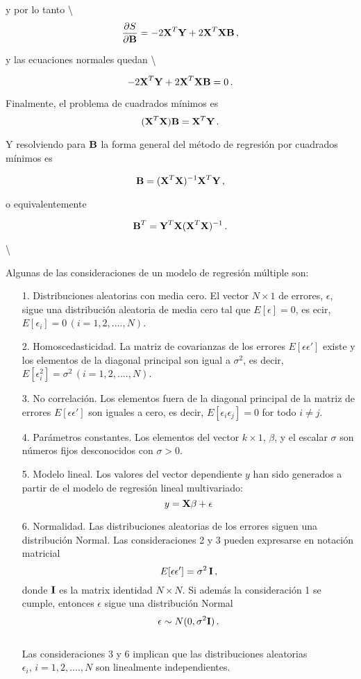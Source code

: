 \documentclass[
]{agujournal2019}
\begin{document}
y por lo tanto \textbackslash{}
\[\frac{\partial{S}}{\partial{\textbf B}}=-2{\textbf X}^T{\textbf Y}+2{\textbf X}^T{\textbf X}{\textbf
B}\,,\]

y las ecuaciones normales quedan \textbackslash{}

\[-2{\textbf X}^T{\textbf Y}+2{\textbf X}^T{\textbf X}{\textbf
B}=0\,.\]

\noindent Finalmente, el problema de cuadrados mínimos es
\[({\textbf X}^T{\textbf X}){\textbf B}={\textbf X}^T{\textbf Y}\,.\]

Y resolviendo para \({\textbf B}\) la forma general del método de
regresión por cuadrados mínimos es

\[{\textbf B}=({\textbf X}^T{\textbf X})^{-1}{\textbf X}^T{\textbf Y}\,,\]

o equivalentemente

\[{\textbf B}^T={\textbf Y}^T{\textbf X}({\textbf X}^T{\textbf X})^{-1}\,.\]

\vspace{0.5cm}

 \textbackslash{}

\noindent Algunas de las consideraciones de un modelo de regresión
múltiple son:

\begin{itemize}
\item[1.]Distribuciones aleatorias con media cero. El vector
$N\times1$ de errores, $\epsilon$, sigue una distribución aleatoria de
media cero tal que $E[\epsilon]=0$, es ecir, $E[\epsilon_i]=
0\,(i=1,2,....,N)$.
\item[2.]Homoscedasticidad. La matriz de covarianzas de los errores
$E[\epsilon \epsilon']$ existe y los elementos de la diagonal
principal son igual a $\sigma^2$, es decir,
$E[\epsilon^2_i]=\sigma^2\,(i=1,2,....,N)$.
\item[3.]No correlación. Los elementos fuera de la diagonal principal
de la matriz de errores $E[\epsilon \epsilon']$ son iguales a cero,
es decir, $E[\epsilon_i\epsilon_j]=0$ for todo $i\neq j$.
\item[4.]Parámetros constantes. Los elementos del vector $k\times1$,
$\beta$, y el escalar $\sigma$ son números fijos desconocidos con
$\sigma>0$.
\item[5.]Modelo lineal. Los valores del vector dependiente $y$ han sido
generados a partir de el modelo de regresión lineal multivariado:
$${ y}={\textbf X}\beta + \epsilon$$
\item[6.]Normalidad. Las distribuciones aleatorias de los errores siguen
una distribución Normal. Las consideraciones 2 y 3 pueden expresarse en
notación matricial
$$E[\epsilon \epsilon']=\sigma^2\,{\textbf I}\,,$$
donde ${\textbf I}$ es la matrix identidad $N\times N$. Si además la
consideración 1 se cumple, entonces $\epsilon$ sigue una distribución Normal
$$\epsilon\sim N(0,\sigma^2{\textbf I})\,.$$
\\
\noindent Las consideraciones 3 y 6 implican que las distribuciones aleatorias $\epsilon_i,\,
i=1,2,....,N$ son linealmente independientes.
\end{itemize}
\end{document}
